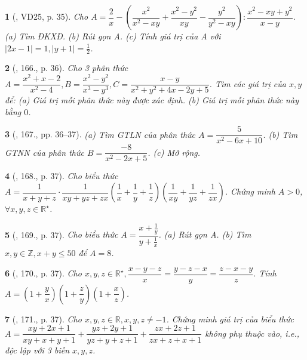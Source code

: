 \documentclass{article}
\newtheorem{baitoan}{}
\begin{document}
\begin{baitoan}[\cite{Tuyen_Toan_8}, VD25, p. 35]
	Cho $A = \dfrac{2}{x} - \left(\dfrac{x^2}{x^2 - xy} + \dfrac{x^2 - y^2}{xy} - \dfrac{y^2}{y^2 - xy}\right):\dfrac{x^2 - xy + y^2}{x - y}$. (a) Tìm {\rm ĐKXĐ}. (b) Rút gọn A. (c) Tính giá trị của A với $|2x - 1| = 1,|y + 1| = \frac{1}{2}$.
\end{baitoan}

\begin{baitoan}[\cite{Tuyen_Toan_8}, 166., p. 36]
	Cho 3 phân thức $A = \dfrac{x^2 + x - 2}{x^2 - 4},B = \dfrac{x^2 - y^2}{x^3 - y^3},C = \dfrac{x - y}{x^2 + y^2 + 4x - 2y + 5}$. Tìm các giá trị của $x,y$ để: (a) Giá trị mỗi phân thức này được xác định. (b) Giá trị mỗi phân thức này bằng $0$.
\end{baitoan}

\begin{baitoan}[\cite{Tuyen_Toan_8}, 167., pp. 36--37]
	(a) Tìm {\rm GTLN} của phân thức $A = \dfrac{5}{x^2 - 6x + 10}$. (b) Tìm {\rm GTNN} của phân thức $B = \dfrac{-8}{x^2 - 2x + 5}$. (c) Mở rộng.
\end{baitoan}

\begin{baitoan}[\cite{Tuyen_Toan_8}, 168., p. 37]
	Cho biểu thức $A = \dfrac{1}{x + y + z}\cdot\dfrac{1}{xy + yz + zx}\left(\dfrac{1}{x} + \dfrac{1}{y} + \dfrac{1}{z}\right)\left(\dfrac{1}{xy} + \dfrac{1}{yz} + \dfrac{1}{zx}\right)$. Chứng minh $A > 0$, $\forall x,y,z\in\mathbb{R}^\star$.
\end{baitoan}

\begin{baitoan}[\cite{Tuyen_Toan_8}, 169., p. 37]
	Cho biểu thức $A = \dfrac{x + \frac{1}{y}}{y + \frac{1}{x}}$. (a) Rút gọn A. (b) Tìm $x,y\in\mathbb{Z},x + y\le50$ để $A = 8$.
\end{baitoan}

\begin{baitoan}[\cite{Tuyen_Toan_8}, 170., p. 37]
	Cho $x,y,z\in\mathbb{R}^\star,\dfrac{x - y - z}{x} = \dfrac{y - z - x}{y} = \dfrac{z - x - y}{z}$. Tính\\$A = \left(1 + \dfrac{y}{x}\right)\left(1 + \dfrac{z}{y}\right)\left(1 + \dfrac{x}{z}\right)$.
\end{baitoan}

\begin{baitoan}[\cite{Tuyen_Toan_8}, 171., p. 37]
	Cho $x,y,z\in\mathbb{R},x,y,z\ne-1$. Chứng minh giá trị của biểu thức $A = \dfrac{xy + 2x + 1}{xy + x + y + 1}  + \dfrac{yz + 2y + 1}{yz + y + z + 1} + \dfrac{zx + 2z + 1}{zx + z + x + 1}$ không phụ thuộc vào, i.e., độc lập với 3 biến $x,y,z$.
\end{baitoan}
\end{document}
